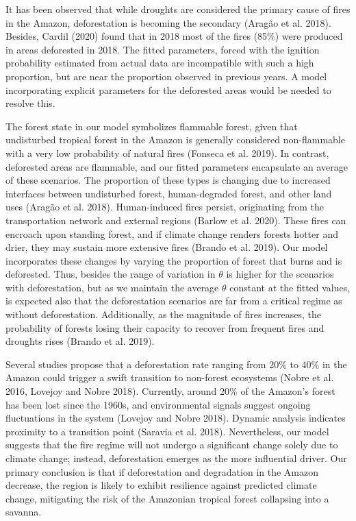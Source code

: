 \documentclass[
]{article}
\begin{document}
It has been observed that while droughts are considered the primary
cause of fires in the Amazon, deforestation is becoming the secondary
(Aragão et al. 2018). Besides, Cardil (2020) found that in 2018 most of
the fires (85\%) were produced in areas deforested in 2018. The fitted
parameters, forced with the ignition probability estimated from actual
data are incompatible with such a high proportion, but are near the
proportion observed in previous years. A model incorporating explicit
parameters for the deforested areas would be needed to resolve this.

The forest state in our model symbolizes flammable forest, given that
undisturbed tropical forest in the Amazon is generally considered
non-flammable with a very low probability of natural fires (Fonseca et
al. 2019). In contrast, deforested areas are flammable, and our fitted
parameters encapsulate an average of these scenarios. The proportion of
these types is changing due to increased interfaces between undisturbed
forest, human-degraded forest, and other land uses (Aragão et al. 2018).
Human-induced fires persist, originating from the transportation network
and external regions (Barlow et al. 2020). These fires can encroach upon
standing forest, and if climate change renders forests hotter and drier,
they may sustain more extensive fires (Brando et al. 2019). Our model
incorporates these changes by varying the proportion of forest that
burns and is deforested. Thus, besides the range of variation in
\(\theta\) is higher for the scenarios with deforestation, but as we
maintain the average \(\theta\) constant at the fitted values, is
expected also that the deforestation scenarios are far from a critical
regime as without deforestation. Additionally, as the magnitude of fires
increases, the probability of forests losing their capacity to recover
from frequent fires and droughts rises (Brando et al. 2019).

Several studies propose that a deforestation rate ranging from 20\% to
40\% in the Amazon could trigger a swift transition to non-forest
ecosystems (Nobre et al. 2016, Lovejoy and Nobre 2018). Currently,
around 20\% of the Amazon's forest has been lost since the 1960s, and
environmental signals suggest ongoing fluctuations in the system
(Lovejoy and Nobre 2018). Dynamic analysis indicates proximity to a
transition point (Saravia et al. 2018). Nevertheless, our model suggests
that the fire regime will not undergo a significant change solely due to
climate change; instead, deforestation emerges as the more influential
driver. Our primary conclusion is that if deforestation and degradation
in the Amazon decrease, the region is likely to exhibit resilience
against predicted climate change, mitigating the risk of the Amazonian
tropical forest collapsing into a savanna.
\end{document}
